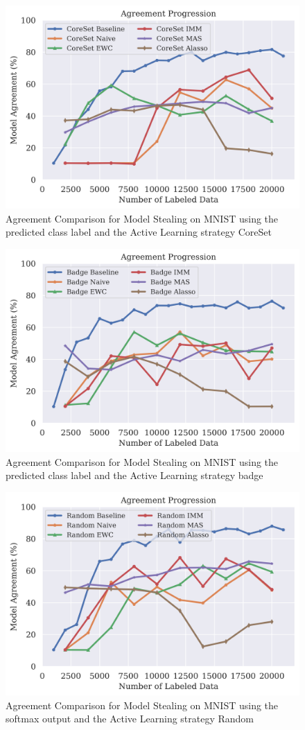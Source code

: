 \begin{figure}[!htb]
    \centering
    \includegraphics[width=0.5\linewidth]{images/results_CALMS/mnist_label_coreset.png}
    \caption{Agreement Comparison for Model Stealing on MNIST using the predicted class label and the Active Learning strategy CoreSet}
    \label{fig:CALMSMNISTLabelCoreSet}
\end{figure}

\begin{figure}[!htb]
    \centering
    \includegraphics[width=0.5\linewidth]{images/results_CALMS/mnist_label_badge.png}
    \caption{Agreement Comparison for Model Stealing on MNIST using the predicted class label and the Active Learning strategy \gls{badge}}
    \label{fig:CALMSMNISTLabelBadge}
\end{figure}

\begin{figure}[!htb]
    \centering
    \includegraphics[width=0.5\linewidth]{images/results_CALMS/mnist_softmax_random.png}
    \caption{Agreement Comparison for Model Stealing on MNIST using the softmax output and the Active Learning strategy Random}
    \label{fig:CALMSMNISTSoftmaxRandom}
\end{figure}

